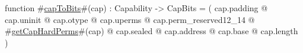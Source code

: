 function #\hyperref[zcapToBits]{capToBits}#(cap) : Capability -> CapBits =
  (
        cap.padding
      @ cap.uninit
      @ cap.otype
      @ cap.uperms
      @ cap.perm_reserved12_14
      @ #\hyperref[zgetCapHardPerms]{getCapHardPerms}#(cap)
      @ cap.sealed
      @ cap.address
      @ cap.base
      @ cap.length
  )

